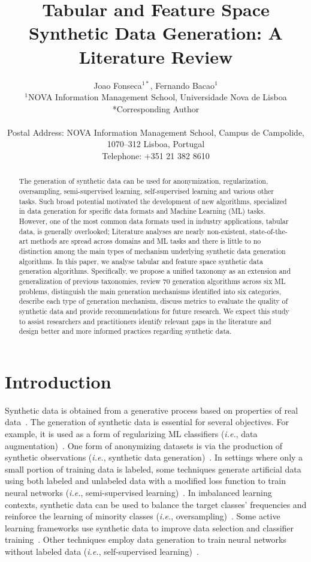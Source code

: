 \documentclass[parskip=full]{scrartcl}
\title{Tabular and Feature Space Synthetic Data Generation: A Literature Review}
\author{%
	Joao Fonseca\(^{1*}\), Fernando Bacao\(^{1}\)
	\\
	\small{\(^{1}\)NOVA Information Management School, Universidade Nova de Lisboa}
	\\
	\small{*Corresponding Author}
	\\
	\\
	\small{Postal Address: NOVA Information Management School, Campus de
    Campolide, 1070--312 Lisboa, Portugal}
	\\
	\small{Telephone: +351 21 382 8610}
}
\date{}
\begin{document}
\maketitle
\linenumbers

\begin{abstract}

    The generation of synthetic data can be used for anonymization,
    regularization, oversampling, semi-supervised learning, self-supervised
    learning and various other tasks. Such broad potential motivated the
    development of new algorithms, specialized in data generation for specific
    data formats and Machine Learning (ML) tasks. However, one of the most
    common data formats used in industry applications, tabular data, is
    generally overlooked; Literature analyses are nearly non-existent,
    state-of-the-art methods are spread across domains and ML tasks and there
    is little to no distinction among the main types of mechanism underlying
    synthetic data generation algorithms. In this paper, we analyse tabular
    and feature space synthetic data generation algorithms. Specifically, we
    propose a unified taxonomy as an extension and generalization of previous
    taxonomies, review 70 generation algorithms across six ML problems,
    distinguish the main generation mechanisms identified into six categories,
    describe each type of generation mechanism, discuss metrics to evaluate
    the quality of synthetic data and provide recommendations for future
    research. We expect this study to assist researchers and practitioners
    identify relevant gaps in the literature and design better and more
    informed practices regarding synthetic data.

\end{abstract}

\section{Introduction}\label{sec:introduction}

Synthetic data is obtained from a generative process based on properties of
real data~\cite{assefa2020generating}. The generation of synthetic data is
essential for several objectives. For example, it is used as a form of
regularizing ML classifiers (\textit{i.e.}, data
augmentation)~\cite{wang2021regularizing}. One form of anonymizing datasets is
via the production of synthetic observations (\textit{i.e.}, synthetic data
generation)~\cite{patki2016synthetic}. In settings where only a small portion
of training data is labeled, some techniques generate artificial data using
both labeled and unlabeled data with a modified loss function to train neural
networks (\textit{i.e.}, semi-supervised learning)~\cite{laine2017temporal}.
In imbalanced learning contexts, synthetic data can be used to balance the
target classes' frequencies and reinforce the learning of minority classes
(\textit{i.e.}, oversampling)~\cite{fonseca2021improving}. Some active
learning frameworks use synthetic data to improve data selection and
classifier training~\cite{kim2021lada}. Other techniques employ data
generation to train neural networks without labeled data (\textit{i.e.},
self-supervised learning)~\cite{grill2020bootstrap}.
\end{document}
